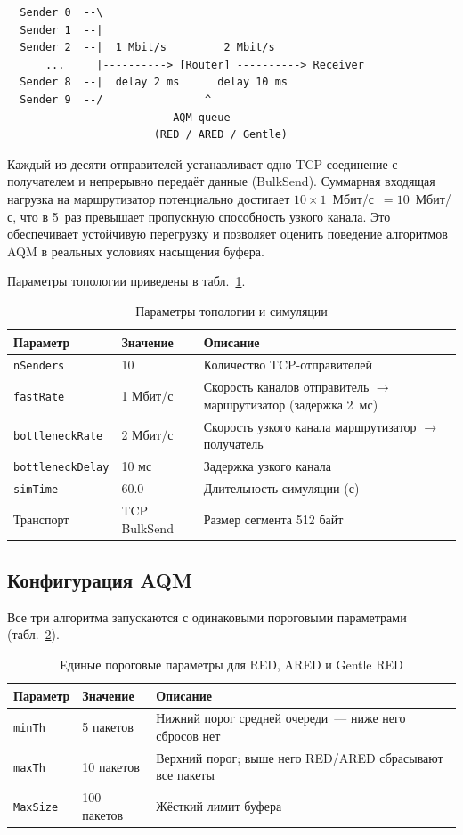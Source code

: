 \documentclass[12pt,a4paper]{article}
\begin{document}
\begin{verbatim}
  Sender 0  --\
  Sender 1  --|
  Sender 2  --|  1 Mbit/s         2 Mbit/s
      ...     |----------> [Router] ----------> Receiver
  Sender 8  --|  delay 2 ms      delay 10 ms
  Sender 9  --/                ^
                          AQM queue
                       (RED / ARED / Gentle)
\end{verbatim}

Каждый из десяти отправителей устанавливает одно TCP-соединение с получателем и непрерывно передаёт данные (BulkSend). Суммарная входящая нагрузка на маршрутизатор потенциально достигает $10 \times 1$~Мбит/с~$= 10$~Мбит/с, что в 5~раз превышает пропускную способность узкого канала. Это обеспечивает устойчивую перегрузку и позволяет оценить поведение алгоритмов AQM в реальных условиях насыщения буфера.

Параметры топологии приведены в табл.~\ref{tab:topology}.

\begin{table}[H]
\centering
\caption{Параметры топологии и симуляции}
\label{tab:topology}
\begin{tabular}{lll}
\toprule
Параметр & Значение & Описание \\
\midrule
\texttt{nSenders} & 10 & Количество TCP-отправителей \\
\texttt{fastRate} & 1 Мбит/с & Скорость каналов отправитель $\to$ маршрутизатор (задержка 2~мс) \\
\texttt{bottleneckRate} & 2 Мбит/с & Скорость узкого канала маршрутизатор $\to$ получатель \\
\texttt{bottleneckDelay} & 10 мс & Задержка узкого канала \\
\texttt{simTime} & 60.0 & Длительность симуляции (с) \\
Транспорт & TCP BulkSend & Размер сегмента 512 байт \\
\bottomrule
\end{tabular}
\end{table}

\subsection{Конфигурация AQM}

Все три алгоритма запускаются с одинаковыми пороговыми параметрами (табл.~\ref{tab:aqm-config}).

\begin{table}[H]
\centering
\caption{Единые пороговые параметры для RED, ARED и Gentle RED}
\label{tab:aqm-config}
\begin{tabular}{lll}
\toprule
Параметр & Значение & Описание \\
\midrule
\texttt{minTh} & 5 пакетов & Нижний порог средней очереди~--- ниже него сбросов нет \\
\texttt{maxTh} & 10 пакетов & Верхний порог; выше него RED/ARED сбрасывают все пакеты \\
\texttt{MaxSize} & 100 пакетов & Жёсткий лимит буфера \\
\bottomrule
\end{tabular}
\end{table}
\end{document}
